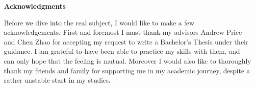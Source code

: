 \thispagestyle{empty}

\vspace*{20mm}

\begin{center}
    {\textbf{\large Acknowledgments} }
\end{center}



\noindent Before we dive into the real subject, I would like to make a few acknowledgements. First and foremost I must thank my advisors Andrew Price and Chen Zhao for accepting my request to write a Bachelor’s Thesis under their guidance. I am grateful to have been able to practice my skills with them, and can only hope that the feeling is mutual. Moreover I would also like to thoroughly thank my friends and family for supporting me in my academic journey, despite a rather unstable start in my studies.

\cleardoublepage{}
